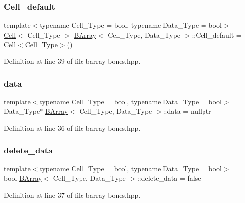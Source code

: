 \subsubsection{\texorpdfstring{Cell\+\_\+default}{Cell\_default}}
{\footnotesize\ttfamily template$<$typename Cell\+\_\+\+Type = bool, typename Data\+\_\+\+Type = bool$>$ \\
\hyperlink{class_cell}{Cell}$<$ Cell\+\_\+\+Type $>$ \hyperlink{class_b_array}{B\+Array}$<$ Cell\+\_\+\+Type, Data\+\_\+\+Type $>$\+::Cell\+\_\+default = \hyperlink{class_cell}{Cell}$<$Cell\+\_\+\+Type$>$()\hspace{0.3cm}{\ttfamily [static]}}



Definition at line 39 of file barray-\/bones.\+hpp.

\mbox{\label{class_b_array_a9576163b52124021575e50dbcca2f6b9}} 
\subsubsection{\texorpdfstring{data}{data}}
{\footnotesize\ttfamily template$<$typename Cell\+\_\+\+Type = bool, typename Data\+\_\+\+Type = bool$>$ \\
Data\+\_\+\+Type$\ast$ \hyperlink{class_b_array}{B\+Array}$<$ Cell\+\_\+\+Type, Data\+\_\+\+Type $>$\+::data = nullptr}



Definition at line 36 of file barray-\/bones.\+hpp.

\mbox{\label{class_b_array_a1e932e3353905d77a2062560ee96b2fc}} 
\subsubsection{\texorpdfstring{delete\+\_\+data}{delete\_data}}
{\footnotesize\ttfamily template$<$typename Cell\+\_\+\+Type = bool, typename Data\+\_\+\+Type = bool$>$ \\
bool \hyperlink{class_b_array}{B\+Array}$<$ Cell\+\_\+\+Type, Data\+\_\+\+Type $>$\+::delete\+\_\+data = false}



Definition at line 37 of file barray-\/bones.\+hpp.

\mbox{\label{class_b_array_a2161dc7c2046a57d3e663ac5c0d70431}} 
